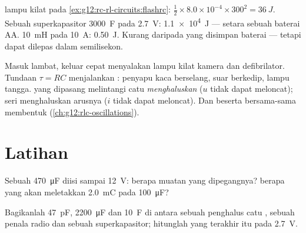 \begin{example}\label{ex:g12:rc-rl-circuits:energies}
 lampu kilat pada \cref{ex:g12:rc-rl-circuits:flashrc}:
$\tfrac12 \times 8.0\times10^{-4} \times 300^2 = \qty{36}{J}$. Sebuah
superkapasitor \qty{3000}{F} pada \qty{2.7}{V}: \qty{1.1e4}{J} --- setara
sebuah baterai AA.  \qty{10}{mH} pada \qty{10}{A}: \qty{0.50}{J}.
Kurang daripada yang disimpan baterai --- tetapi dapat dilepas dalam semilisekon.
\end{example}

\begin{remark}\label{rem:g12:rc-rl-circuits:applications}
Masuk lambat, keluar cepat menyalakan lampu kilat kamera dan defibrilator.
Tundaan $\tau = RC$ menjalankan : penyapu kaca berselang,
suar berkedip, lampu tangga.  yang dipasang melintangi catu
\emph{menghaluskan}  ($u$ tidak dapat meloncat);  seri
menghaluskan arusnya ($i$ tidak dapat meloncat). Dan  beserta 
bersama-sama membentuk  (\cref{ch:g12:rlc-oscillations}).
\end{remark}

\section{Latihan}

\begin{exercise}[$\star$]\label{exo:g12:rc-rl-circuits:1}
Sebuah  \qty{470}{\micro F} diisi sampai \qty{12}{V}: berapa muatan yang
dipegangnya?  berapa yang akan meletakkan \qty{2.0}{mC} pada \qty{100}{\micro F}?
\end{exercise}

\begin{exercise}[$\star$]\label{exo:g12:rc-rl-circuits:2}
Bagikanlah \qty{47}{pF}, \qty{2200}{\micro F} dan \qty{10}{F} di antara sebuah
penghalus catu , sebuah penala radio dan sebuah superkapasitor; hitunglah 
yang terakhir itu pada \qty{2.7}{V}.
\end{exercise}

